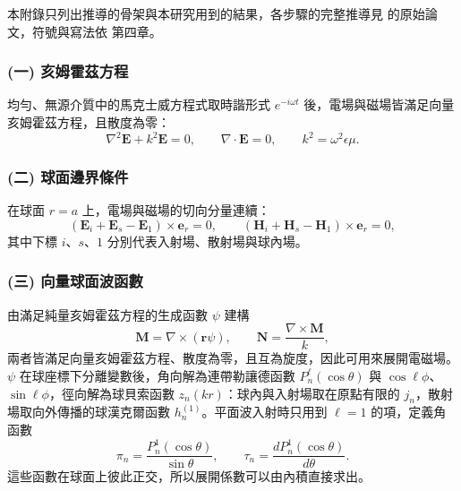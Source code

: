 本附錄只列出推導的骨架與本研究用到的結果，各步驟的完整推導見 \textcite{https://doi.org/10.1002/andp.19083300302} 的原始論文，符號與寫法依 \textcite{bohren1983Absorption} 第四章。

\subsubsection*{(一) 亥姆霍茲方程}
均勻、無源介質中的馬克士威方程式取時諧形式 $e^{-i\omega t}$ 後，電場與磁場皆滿足向量亥姆霍茲方程，且散度為零：
\begin{equation}
    \nabla^2\mathbf{E} + k^2 \mathbf{E} = 0, \qquad \nabla\cdot\mathbf{E}=0, \qquad k^2 = \omega^2 \epsilon \mu .
\end{equation}

\subsubsection*{(二) 球面邊界條件}
在球面 $r=a$ 上，電場與磁場的切向分量連續：
\begin{equation}
    \left(\mathbf{E}_{i} + \mathbf{E}_{s} - \mathbf{E}_{1}\right) \times \mathbf{e}_r = 0, \qquad \left(\mathbf{H}_{i} + \mathbf{H}_{s} - \mathbf{H}_{1}\right) \times \mathbf{e}_r = 0 ,
\end{equation}
其中下標 $i$、$s$、$1$ 分別代表入射場、散射場與球內場。

\subsubsection*{(三) 向量球面波函數}
由滿足純量亥姆霍茲方程的生成函數 $\psi$ 建構
\begin{equation}
    \mathbf{M} = \nabla \times (\mathbf{r} \psi), \qquad \mathbf{N} = \frac{\nabla \times \mathbf{M}}{k},
\end{equation}
兩者皆滿足向量亥姆霍茲方程、散度為零，且互為旋度，因此可用來展開電磁場。$\psi$ 在球座標下分離變數後，角向解為連帶勒讓德函數 $P_n^{\ell}(\cos\theta)$ 與 $\cos\ell\phi$、$\sin\ell\phi$，徑向解為球貝索函數 $z_n(kr)$：球內與入射場取在原點有限的 $j_n$，散射場取向外傳播的球漢克爾函數 $h_n^{(1)}$。平面波入射時只用到 $\ell=1$ 的項，定義角函數
\begin{equation}
    \pi_n = \frac{P_n^1\left(\cos\theta\right)}{\sin\theta}, \qquad \tau_n = \frac{dP_n^1\left(\cos\theta\right)}{d\theta} .
\end{equation}
這些函數在球面上彼此正交，所以展開係數可以由內積直接求出\parencite{bohren1983Absorption}。

